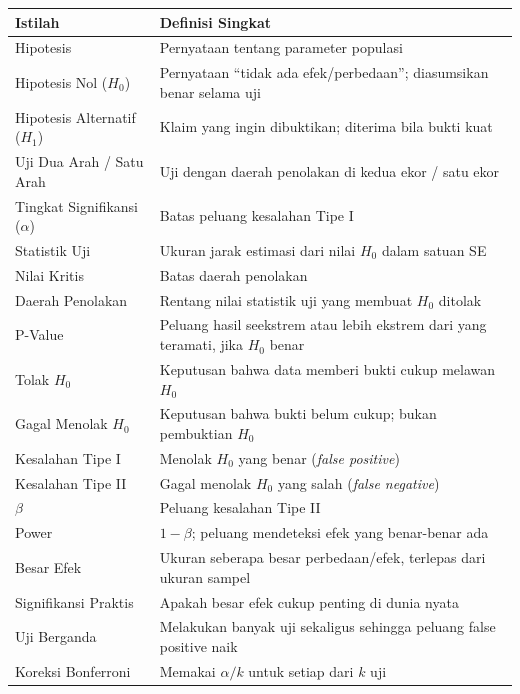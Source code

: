 \documentclass[
  indonesian,
  letterpaper,
]{book}
\newcounter{none} %
\begin{document}
{\def\LTcaptype{none} %
\begin{longtable}[]{@{}
  >{\raggedright\arraybackslash}p{}
  >{\raggedright\arraybackslash}p{}@{}}
\toprule\noalign{}
\begin{minipage}[b]{\linewidth}\raggedright
Istilah
\end{minipage} & \begin{minipage}[b]{\linewidth}\raggedright
Definisi Singkat
\end{minipage} \\
\midrule\noalign{}
\endhead
\bottomrule\noalign{}
\endlastfoot
Hipotesis & Pernyataan tentang parameter populasi \\
Hipotesis Nol (\(H_0\)) & Pernyataan ``tidak ada efek/perbedaan'';
diasumsikan benar selama uji \\
Hipotesis Alternatif (\(H_1\)) & Klaim yang ingin dibuktikan; diterima
bila bukti kuat \\
Uji Dua Arah / Satu Arah & Uji dengan daerah penolakan di kedua ekor /
satu ekor \\
Tingkat Signifikansi (\(\alpha\)) & Batas peluang kesalahan Tipe I \\
Statistik Uji & Ukuran jarak estimasi dari nilai \(H_0\) dalam satuan
SE \\
Nilai Kritis & Batas daerah penolakan \\
Daerah Penolakan & Rentang nilai statistik uji yang membuat \(H_0\)
ditolak \\
P-Value & Peluang hasil seekstrem atau lebih ekstrem dari yang teramati,
jika \(H_0\) benar \\
Tolak \(H_0\) & Keputusan bahwa data memberi bukti cukup melawan
\(H_0\) \\
Gagal Menolak \(H_0\) & Keputusan bahwa bukti belum cukup; bukan
pembuktian \(H_0\) \\
Kesalahan Tipe I & Menolak \(H_0\) yang benar (\emph{false positive}) \\
Kesalahan Tipe II & Gagal menolak \(H_0\) yang salah (\emph{false
negative}) \\
\(\beta\) & Peluang kesalahan Tipe II \\
Power & \(1-\beta\); peluang mendeteksi efek yang benar-benar ada \\
Besar Efek & Ukuran seberapa besar perbedaan/efek, terlepas dari ukuran
sampel \\
Signifikansi Praktis & Apakah besar efek cukup penting di dunia nyata \\
Uji Berganda & Melakukan banyak uji sekaligus sehingga peluang false
positive naik \\
Koreksi Bonferroni & Memakai \(\alpha/k\) untuk setiap dari \(k\) uji \\
\end{longtable}
}
\end{document}
